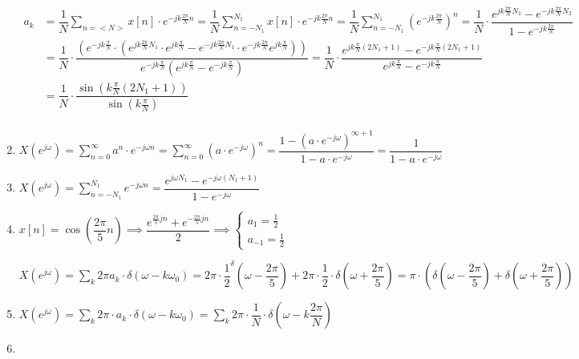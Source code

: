 \begin{enumerate}[label=\color{red}\textbf{\arabic*)}]
$
\begin{aligned}
    a_k&=\dfrac{1}{N}\sum_{n=<N>} x[n]\cdot e^{-jk\frac{2\pi}{N} n} =\dfrac{1}{N}\sum_{n=-N_1}^{N_1} x[n]\cdot e^{-jk\frac{2\pi}{N} n} =\dfrac{1}{N}\sum_{n=-N_1}^{N_1} \left( e^{-jk\frac{2\pi}{N} }  \right) ^n=\dfrac{1}{N}\cdot \dfrac{e^{jk\frac{2\pi}{N} N_1} -e^{-jk\frac{2\pi}{N} N_2} }{1-e^{-jk\frac{2\pi}{N} } }\\
       &= \dfrac{1}{N}\cdot \dfrac{\left( e^{-jk\frac{\pi}{N} } \cdot \left( e^{jk\frac{2\pi}{N} N_1}\cdot e^{jk\frac{\pi}{N} } -e^{-jk\frac{2\pi}{N} N_1} \cdot e^{-jk\frac{2\pi}{N} } e^{jk\frac{\pi}{N} }   \right)  \right) }{e^{-jk\frac{\pi}{N}} \left( e^{jk\frac{\pi}{N} } -e^{-jk\frac{\pi}{N} }  \right) }=\dfrac{1}{N}\cdot \dfrac{e^{jk\frac{\pi}{N} (2N_1+1)} -e^{-jk\frac{\pi}{N} (2N_1+1)} }{e^{jk\frac{\pi}{N} } -e^{-jk\frac{\pi}{N} } } \\
       &= \dfrac{1}{N}\cdot \dfrac{\sin\left( k\frac{\pi}{N} (2N_1+1) \right) }{\sin\left(   k\frac{\pi}{N}\right)} \\
\end{aligned}
$
\newpage
\item {} 

$X(e^{j\omega} )=\sum_{n=0}^{\infty} a^n \cdot  e^{-j\omega n}=\sum_{n=0}^{\infty} (a\cdot e^{-j\omega} )^n=\dfrac{1-(a\cdot e^{-j\omega} )^{\infty+1}}{1-a\cdot e^{-j\omega} }=\dfrac{1}{1-a\cdot e^{-j\omega} }$
\item {} 
$X(e^{j\omega} )=\sum_{n=-N_1}^{N_1} e^{-j\omega n}= \dfrac{e^{j\omega N_1} -e^{-j\omega(N_1+1)} }{1-e^{-j\omega} }$
\item {} 

$x[n]=\cos\left( \dfrac{2\pi}{5}n \right)\implies \dfrac{e^{\frac{2\pi}{5} jn} +e^{-\frac{2\pi}{5} jn} }{2}\implies \begin{cases}
    a_1=\tfrac{1}{2} \\
    a_{-1}=\tfrac{1}{2} 
\end{cases}$ 

$X(e^{j\omega} )=\sum_k 2\pi a_k\cdot \delta(\omega-k\omega_0)=2\pi\cdot \dfrac{1}{2}^\delta\left( \omega-\dfrac{2\pi}{5} \right) +2\pi\cdot \dfrac{1}{2}\cdot \delta\left( \omega+\dfrac{2\pi}{5} \right) =\pi\cdot \left( \delta\left( \omega-\dfrac{2\pi}{5} \right) +\delta\left( \omega+\dfrac{2\pi}{5} \right)  \right) $
\item {} 
$X(e^{j\omega} )=\sum_k 2\pi \cdot a_k\cdot \delta(\omega-k\omega_0)=\sum_k 2\pi\cdot \dfrac{1}{N}\cdot \delta\left( \omega-k \dfrac{2\pi}{N} \right)$
\item {} 


\end{enumerate}
